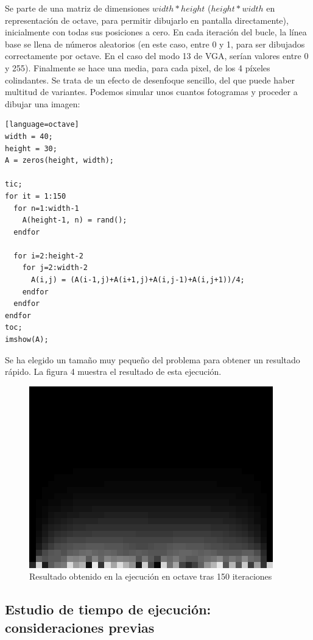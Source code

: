 \documentclass[a4,12pt]{article}
\begin{document}
Se parte de una matriz de dimensiones \(width*height\) (\(height*width\) en representación de octave, para permitir dibujarlo en pantalla directamente), inicialmente con todas sus posiciones a cero. En cada iteración del bucle, la línea base se llena de números aleatorios (en este caso, entre 0 y 1, para ser dibujados correctamente por octave. En el caso del modo 13 de VGA, serían valores entre 0 y 255).
\newline
\newline
Finalmente se hace una media, para cada pixel, de los 4 píxeles colindantes. Se trata de un efecto de desenfoque sencillo, del que puede haber multitud de variantes. Podemos simular unos cuantos fotogramas y proceder a dibujar una imagen:
\bigskip
\lstset{language=Octave}
\begin{lstlisting}[frame=single][language=octave]
width = 40;
height = 30;
A = zeros(height, width);

tic;
for it = 1:150
  for n=1:width-1
    A(height-1, n) = rand();
  endfor

  for i=2:height-2
    for j=2:width-2
      A(i,j) = (A(i-1,j)+A(i+1,j)+A(i,j-1)+A(i,j+1))/4;
    endfor
  endfor
endfor
toc;
imshow(A);
\end{lstlisting}

Se ha elegido un tamaño muy pequeño del problema para obtener un resultado rápido. La figura 4 muestra el resultado de esta ejecución.
\begin{figure}[h!]
  \centering
    \includegraphics[scale=1.25]{img/resultado}
  \caption{Resultado obtenido en la ejecución en octave tras 150 iteraciones}
\end{figure}

\subsection{Estudio de tiempo de ejecución: consideraciones previas}
\end{document}
